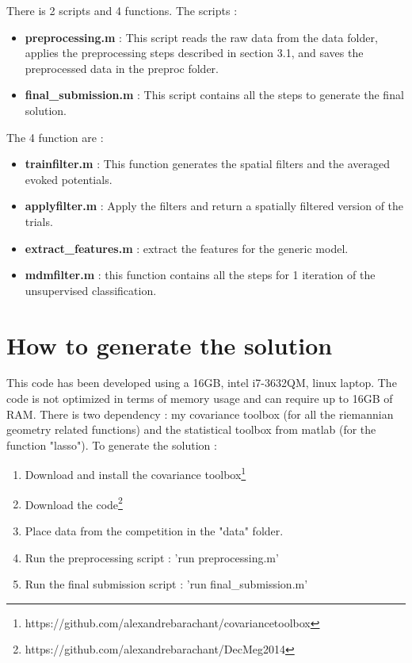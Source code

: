 \documentclass[11pt,a4paper]{article}
\begin{document}
There is 2 scripts and 4 functions. The scripts :
\begin{itemize}
\item \textbf{preprocessing.m} : This script reads the raw data from the data folder, applies the preprocessing steps described in section 3.1, and saves the preprocessed data in the preproc folder.
\item \textbf{final\_submission.m} : This script contains all the steps to generate the final solution.
\end{itemize}
The 4 function are : 
\begin{itemize}
\item \textbf{trainfilter.m} : This function generates the spatial filters and the averaged evoked potentials.
\item \textbf{applyfilter.m} : Apply the filters and return a spatially filtered version of the trials.
\item \textbf{extract\_features.m} : extract the features for the generic model.
\item \textbf{mdmfilter.m} : this function contains all the steps for 1 iteration of the unsupervised classification.
\end{itemize}
\section{How to generate the solution}
This code has been developed using a 16GB, intel i7-3632QM, linux laptop. The code is not optimized in terms of memory usage and can require up to 16GB of RAM. There is two dependency : my covariance toolbox (for all the riemannian geometry related functions) and the statistical toolbox from matlab (for the function "lasso").
To generate the solution : 
\begin{enumerate}
\item Download and install the covariance toolbox\footnote{https://github.com/alexandrebarachant/covariancetoolbox}
\item Download the code\footnote{https://github.com/alexandrebarachant/DecMeg2014}
\item Place data from the competition in the "data" folder.
\item Run the preprocessing script : 'run preprocessing.m'
\item Run the final submission script : 'run final\_submission.m' 
\end{enumerate}
\end{document}
